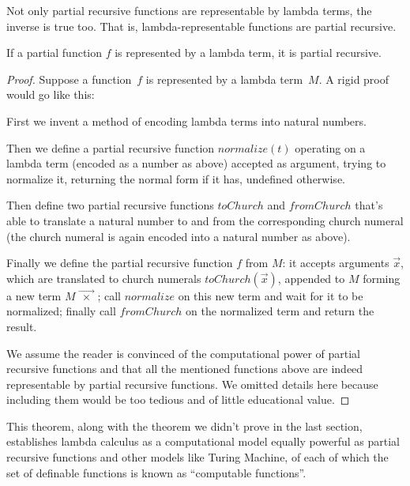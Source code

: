 \documentclass[../../../include/open-logic-section]{subfiles}
\begin{document}

Not only partial recursive functions are representable by lambda
terms, the inverse is true too. That is, lambda-representable
functions are partial recursive.

\begin{thm}
If a partial function $f$ is represented by a lambda term, it is
partial recursive.
\end{thm}
\begin{proof}
  Suppose a function~$f$ is represented by a lambda term~$M$. A 
  rigid proof would go like this:
  
  First we invent a method of encoding lambda terms into natural
  numbers.

  Then we define a partial recursive function $normalize(t)$ operating on
  a lambda term (encoded as a number as above) accepted as argument, trying to
  normalize it, returning the normal form if it has, undefined otherwise.

  Then define two partial recursive functions $toChurch$ and $fromChurch$ that's able to translate a
  natural number to and from the corresponding church numeral (the
  church numeral is again encoded into a natural number as above).

  Finally we define the partial recursive function $f$ from $M$: it accepts
  arguments $\vec x$, which are translated to church numerals
  $toChurch(\vec x)$, appended to
  $M$ forming a new term $M \vec{\num{x}}$; call
  $normalize$ on this new term and wait for it to be normalized;
  finally call $fromChurch$ on the normalized term and return the
  result.

  We assume the reader is convinced of the computational power of
  partial recursive functions and that all the mentioned functions
  above are indeed representable by partial recursive functions. We
  omitted details here because including them would be
  too tedious and of little educational value.
\end{proof}

This theorem, along with the theorem we didn't prove in the last
section, establishes lambda calculus as a
computational model equally powerful as partial recursive functions
and other models like Turing Machine, of each of which the set of
definable functions is known as ``computable functions''.
\end{document}
